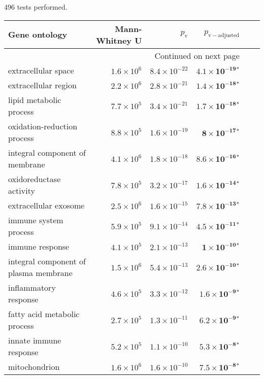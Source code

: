 496 tests performed.\scriptsize
\begin{longtable}{|l|r|r|r|r|r|}
\toprule
                            Gene ontology &     Mann-Whitney U &     $p_{\mathrm{v}}$ &      $p_{\mathrm{v-adjusted}}$ \\
\midrule
\endhead
\midrule
\multicolumn{4}{r}{{Continued on next page}} \\
\midrule
\endfoot

\bottomrule
\endlastfoot
                      extracellular space & $1.6\times 10^{6}$ & $8.4\times 10^{-22}$ &  $\bm{4.1\times 10^{-19}{^*}}$ \\
                     extracellular region & $2.2\times 10^{6}$ & $2.8\times 10^{-21}$ &  $\bm{1.4\times 10^{-18}{^*}}$ \\
                  lipid metabolic process & $7.7\times 10^{5}$ & $3.4\times 10^{-21}$ &  $\bm{1.7\times 10^{-18}{^*}}$ \\
              oxidation-reduction process & $8.8\times 10^{5}$ & $1.6\times 10^{-19}$ &   $\bm{ 8\times 10^{-17}{^*}}$ \\
           integral component of membrane & $4.1\times 10^{6}$ & $1.8\times 10^{-18}$ &  $\bm{8.6\times 10^{-16}{^*}}$ \\
                  oxidoreductase activity & $7.8\times 10^{5}$ & $3.2\times 10^{-17}$ &  $\bm{1.6\times 10^{-14}{^*}}$ \\
                    extracellular exosome & $2.5\times 10^{6}$ & $1.6\times 10^{-15}$ &  $\bm{7.8\times 10^{-13}{^*}}$ \\
                    immune system process & $5.9\times 10^{5}$ & $9.1\times 10^{-14}$ &  $\bm{4.5\times 10^{-11}{^*}}$ \\
                          immune response & $4.1\times 10^{5}$ & $2.1\times 10^{-13}$ &   $\bm{ 1\times 10^{-10}{^*}}$ \\
    integral component of plasma membrane & $1.5\times 10^{6}$ & $5.4\times 10^{-13}$ &  $\bm{2.6\times 10^{-10}{^*}}$ \\
                    inflammatory response & $4.6\times 10^{5}$ & $3.3\times 10^{-12}$ &   $\bm{1.6\times 10^{-9}{^*}}$ \\
             fatty acid metabolic process & $2.7\times 10^{5}$ & $1.3\times 10^{-11}$ &   $\bm{6.2\times 10^{-9}{^*}}$ \\
                   innate immune response & $5.2\times 10^{5}$ & $1.1\times 10^{-10}$ &   $\bm{5.3\times 10^{-8}{^*}}$ \\
                            mitochondrion & $1.6\times 10^{6}$ & $1.6\times 10^{-10}$ &   $\bm{7.5\times 10^{-8}{^*}}$ \\

\end{longtable}
